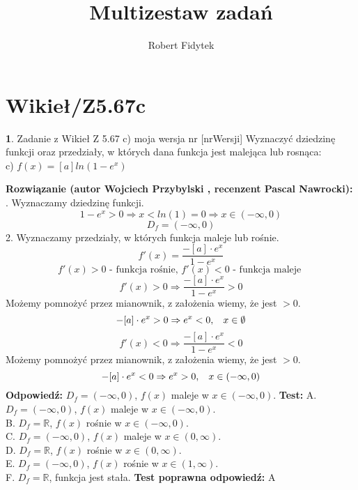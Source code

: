 \documentclass[12pt, a4paper]{article}
\title{Multizestaw zadań}
\author{Robert Fidytek}
\date{}
\theoremstyle{definition} %
\newtheorem{zad}{}
\newcommand{\kategoria}[1]{\section{#1}} %
\newcommand{\zadStart}[1]{\begin{zad}#1\newline} %
\newcommand{\zadStop}{\end{zad}}   %
\newcommand{\rozwStart}[2]{\noindent \textbf{Rozwiązanie (autor #1 , recenzent #2): }\newline} %
\newcommand{\rozwStop}{\newline}                                            %
\newcommand{\odpStart}{\noindent \textbf{Odpowiedź:}\newline}    %
\newcommand{\odpStop}{\newline}                                             %
\newcommand{\testStart}{\noindent \textbf{Test:}\newline} %
\newcommand{\testStop}{\newline} %
\newcommand{\kluczStart}{\noindent \textbf{Test poprawna odpowiedź:}\newline} %
\newcommand{\kluczStop}{\newline} %
\begin{document}
\maketitle


\kategoria{Wikieł/Z5.67c}
\zadStart{Zadanie z Wikieł Z 5.67 c) moja wersja nr [nrWersji]}
Wyznaczyć dziedzinę funkcji oraz przedziały, w których dana funkcja jest malejąca lub rosnąca:\\
c) $f(x)=[a]ln(1-e^{x})$
\zadStop
\rozwStart{Wojciech Przybylski}{Pascal Nawrocki}
1. Wyznaczamy dziedzinę funkcji.
$$1-e^{x}>0 \Rightarrow x<ln(1)=0 \Rightarrow x\in(-\infty,0)$$
$$D_{f}=(-\infty,0)$$
2. Wyznaczamy przedziały, w których funkcja maleje lub rośnie. 
$$f'(x)=\frac{-[a]\cdot e^{x}}{1-e^{x}}$$
$$f'(x)>0 \mbox{ - funkcja rośnie, } f'(x)<0 \mbox{ - funkcja maleje }$$
$$f'(x)>0\Rightarrow \frac{-[a]\cdot e^{x}}{1-e^{x}}>0$$
Możemy pomnożyć przez mianownik, z założenia wiemy, że jest $>0$.
$$-[a]\cdot e^{x}>0 \Rightarrow e^{x}<0, \hspace{3mm} x\in\emptyset$$
$$f'(x)<0\Rightarrow \frac{-[a]\cdot e^{x}}{1-e^{x}}<0 $$
Możemy pomnożyć przez mianownik, z założenia wiemy, że jest $>0$.
$$-[a]\cdot e^{x}<0 \Rightarrow e^{x}>0, \hspace{3mm} x\in(-\infty,0)$$
\rozwStop
\odpStart
$D_{f}=(-\infty,0)$, $f(x)$ maleje w $x\in(-\infty,0)$.
\odpStop
\testStart
A. $D_{f}=(-\infty,0)$, $f(x)$ maleje w $x\in(-\infty,0)$.\\
B. $D_{f}=\mathbb{R}$, $f(x)$ rośnie w $x\in(-\infty,0)$.\\
C. $D_{f}=(-\infty,0)$, $f(x)$ maleje w $x\in(0,\infty)$.\\
D. $D_{f}=\mathbb{R}$, $f(x)$ rośnie w $x\in(0,\infty)$.\\
E. $D_{f}=(-\infty,0)$, $f(x)$ rośnie w $x\in(1,\infty)$.\\
F. $D_{f}=\mathbb{R}$, funkcja jest stała.
\testStop
\kluczStart
A
\kluczStop
\end{document}
